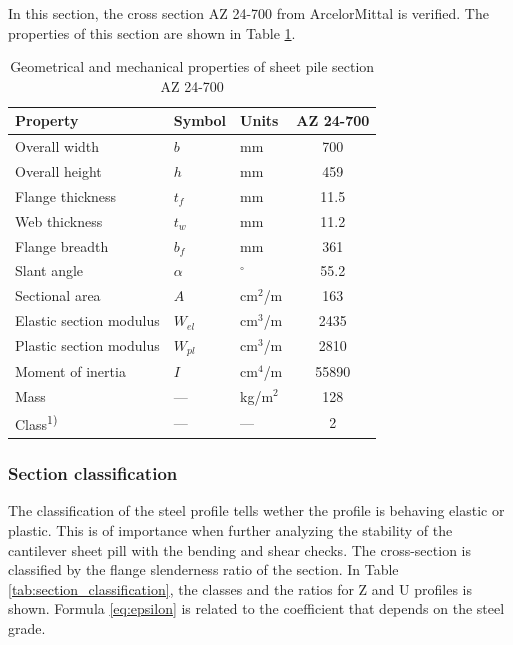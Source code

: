 In this section, the cross section AZ 24-700 from ArcelorMittal is verified. The properties of this section are shown in Table \ref{tab:pu32}.


\begin{table}[H]
  \centering
  \small
  \setlength{\tabcolsep}{6pt}
  \renewcommand{\arraystretch}{1.15}
  \caption{Geometrical and mechanical properties of sheet pile section AZ 24-700}
  \label{tab:pu32}
  \begin{tabular}{@{}l l l c@{}}
    \toprule
    Property & Symbol & Units & AZ 24-700 \\
    \midrule
    Overall width                & $b$     & mm     & 700   \\
    Overall height               & $h$     & mm     & 459   \\
    Flange thickness             & $t_f$   & mm     & 11.5  \\
    Web thickness                & $t_w$   & mm     & 11.2  \\
    Flange breadth               & $b_f$   & mm     & 361   \\
    Slant angle                  & $\alpha$ & $^\circ$ & 55.2 \\
    Sectional area               & $A$     & cm$^2$/m & 163 \\
    Elastic section modulus      & $W_{el}$ & cm$^3$/m & 2435 \\
    Plastic section modulus      & $W_{pl}$ & cm$^3$/m & 2810 \\
    Moment of inertia            & $I$     & cm$^4$/m & 55890 \\
    Mass                         & ---     & kg/m$^2$ & 128 \\
    Class\textsuperscript{1)}    & ---     & ---     & 2 \\
    \bottomrule
  \end{tabular}
\end{table}


\subsubsection{Section classification}

The classification of the steel profile tells wether the profile is behaving elastic or plastic. This is of importance when further analyzing the stability of the cantilever sheet pill with the bending and shear checks. The cross-section is classified by the flange slenderness ratio of the section. In Table \ref{tab:section_classification}, the classes and the ratios for Z and U profiles is shown. Formula \ref{eq:epsilon} is related to the coefficient that depends on the steel grade. 

